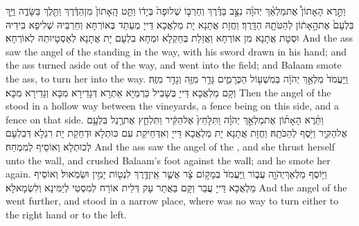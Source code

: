 {וַתֵּ֣רֶא הָאָתוֹן֩ אֶת\maqqaf מַלְאַ֨ךְ יְהֹוָ֜ה נִצָּ֣ב בַּדֶּ֗רֶךְ וְחַרְבּ֤וֹ שְׁלוּפָה֙ בְּיָד֔וֹ וַתֵּ֤ט הָֽאָתוֹן֙ מִן\maqqaf הַדֶּ֔רֶךְ וַתֵּ֖לֶךְ בַּשָּׂדֶ֑ה וַיַּ֤ךְ בִּלְעָם֙ אֶת\maqqaf הָ֣אָת֔וֹן לְהַטֹּתָ֖הּ הַדָּֽרֶךְ׃}
{וַחֲזָת אֲתָנָא יָת מַלְאֲכָא דַּייָ מְעַתַּד בְּאוֹרְחָא וְחַרְבֵּיהּ שְׁלִיפָא בִּידֵיהּ וּסְטָת אֲתָנָא מִן אוֹרְחָא וַאֲזַלַת בְּחַקְלָא וּמְחָא בִלְעָם יָת אֲתָנָא לְאַסְטָיוּתַהּ לְאוֹרְחָא׃}
{And the ass saw the angel of the \lord\space standing in the way, with his sword drawn in his hand; and the ass turned aside out of the way, and went into the field; and Balaam smote the ass, to turn her into the way.}{}
{וַֽיַּעֲמֹד֙ מַלְאַ֣ךְ יְהֹוָ֔ה בְּמִשְׁע֖וֹל הַכְּרָמִ֑ים גָּדֵ֥ר מִזֶּ֖ה וְגָדֵ֥ר מִזֶּֽה׃}
{וְקָם מַלְאֲכָא דַּייָ בְּשָׁבִיל כַּרְמַיָּא אַתְרָא דְּגָדֵירָא מִכָּא וְגָדֵירָא מִכָּא׃}
{Then the angel of the \lord\space stood in a hollow way between the vineyards, a fence being on this side, and a fence on that side.}{}
{וַתֵּ֨רֶא הָאָת֜וֹן אֶת\maqqaf מַלְאַ֣ךְ יְהֹוָ֗ה וַתִּלָּחֵץ֙ אֶל\maqqaf הַקִּ֔יר וַתִּלְחַ֛ץ אֶת\maqqaf רֶ֥גֶל בִּלְעָ֖ם אֶל\maqqaf הַקִּ֑יר וַיֹּ֖סֶף לְהַכֹּתָֽהּ׃}
{וַחֲזָת אֲתָנָא יָת מַלְאֲכָא דַּייָ וְאִדְּחֵיקַת עִם כּוּתְלָא וּדְחַקַת יָת רִגְלָא דְּבִלְעָם לְכוּתְלָא וְאוֹסֵיף לְמִמְחַהּ׃}
{And the ass saw the angel of the \lord, and she thrust herself unto the wall, and crushed Balaam’s foot against the wall; and he smote her again.}{}
{וַיּ֥וֹסֶף מַלְאַךְ\maqqaf יְהֹוָ֖ה עֲב֑וֹר וַֽיַּעֲמֹד֙ בְּמָק֣וֹם צָ֔ר אֲשֶׁ֛ר אֵֽין\maqqaf דֶּ֥רֶךְ לִנְט֖וֹת יָמִ֥ין וּשְׂמֹֽאול׃}
{וְאוֹסֵיף מַלְאֲכָא דַּייָ עֲבַר וְקָם בַּאֲתַר עָק דְּלֵית אוֹרַח לְמִסְטֵי לְיַמִּינָא וְלִשְׂמָאלָא׃}
{And the angel of the \lord\space went further, and stood in a narrow place, where was no way to turn either to the right hand or to the left.}{}
